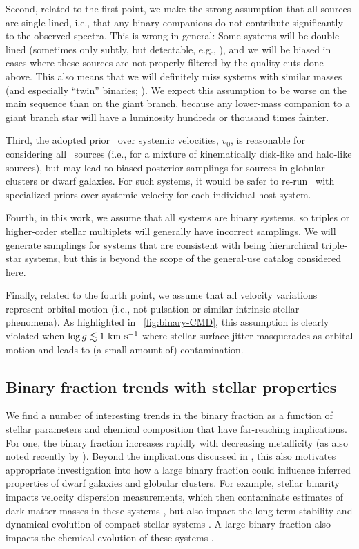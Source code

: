 \documentclass[modern]{aastex63}
\begin{document}
Second, related to the first point, we make the strong assumption that all
sources are single-lined, i.e., that any binary companions do not contribute
significantly to the observed spectra.
This is wrong in general: Some systems will be double lined (sometimes only
subtly, but detectable, e.g., \citealt{El-Badry:2018}), and we will be biased in
cases where these sources are not properly filtered by the quality cuts done
above.
This also means that we will definitely miss systems with similar masses (and
especially ``twin'' binaries; \citealt{El-Badry:2019}).
We expect this assumption to be worse on the main sequence than on the giant
branch, because any lower-mass companion to a giant branch star will have a
luminosity hundreds or thousand times fainter.

Third, the adopted prior \pdf\ over systemic velocities, $v_0$, is reasonable
for considering all \apogee\ sources (i.e., for a mixture of kinematically
disk-like and halo-like sources), but may lead to biased posterior samplings for
sources in globular clusters or dwarf galaxies.
For such systems, it would be safer to re-run \thejoker\ with specialized priors
over systemic velocity for each individual host system.

Fourth, in this work, we assume that all systems are binary systems, so triples
or higher-order stellar multiplets will generally have incorrect samplings.
We will generate samplings for systems that are consistent with being
hierarchical triple-star systems, but this is beyond the scope of the
general-use catalog considered here.

Finally, related to the fourth point, we assume that all velocity variations
represent orbital motion (i.e., not pulsation or similar intrinsic stellar
phenomena).
As highlighted in \figurename~\ref{fig:binary-CMD}, this assumption is clearly
violated when $\log g \lesssim 1~\mathrm{km}~\mathrm{s}^{-1}$ where stellar surface jitter masquerades
as orbital motion and leads to (a small amount of) contamination.


\subsection{Binary fraction trends with stellar properties}
\label{sec:binary-trends}

We find a number of interesting trends in the binary fraction as a function of
stellar parameters and chemical composition that have far-reaching implications.
For one, the binary fraction increases rapidly with decreasing metallicity (as
also noted recently by \citealt{Moe:2019, El-Badry:2019a}).
Beyond the implications discussed in \cite{Moe:2019}, this also motivates
appropriate investigation into how a large binary fraction could influence
inferred properties of dwarf galaxies and globular clusters.
For example, stellar binarity impacts velocity dispersion measurements, which
then contaminate estimates of dark matter masses in these systems
\citep[e.g.,][]{Aaronson:1987, Kouwenhoven:2008, Spencer:2017, Spencer:2018},
but also impact the long-term stability and dynamical evolution of compact
stellar systems \citep[e.g.,][]{Hut:1992, Sigurdsson:1993}.
A large binary fraction also impacts the chemical evolution of these systems
\citep[e.g.,][]{Eldridge:2008, Eldridge:2009}.
\end{document}
